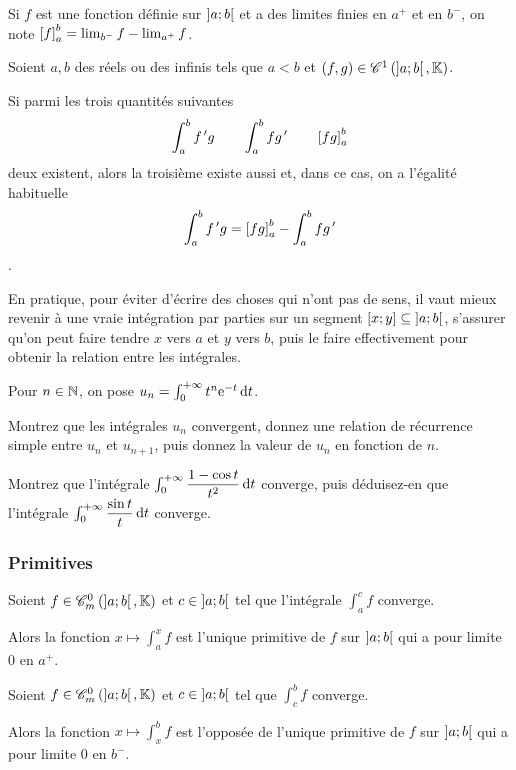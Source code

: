 Si \(f\) est une fonction définie sur \(\left]a;b\right[\) et a des limites finies en \(a^+\) et en \(b^-\), on note \(\left[f\right]_a^b=\lim_{b^-}f-\lim_{a^+}f\).

\begin{prop}
Soient \(a,b\) des réels ou des infinis tels que \(a<b\) et \(\left(f,g\right)\in\mathscr{C}^{1}\left(\left]a;b\right[,\mathbb{K}\right)\).

Si parmi les trois quantités suivantes \[\int_a^bf^{\,\prime} g\qquad\int_a^bfg^{\,\prime}\qquad\left[fg\right]_a^b\] deux existent, alors la troisième existe aussi et, dans ce cas, on a l'égalité habituelle \[\int_a^bf^{\,\prime} g=\left[fg\right]_a^b-\int_a^bfg^{\,\prime}\].
\end{prop}

En pratique, pour éviter d'écrire des choses qui n'ont pas de sens, il vaut mieux revenir à une vraie intégration par parties sur un segment \(\left[x;y\right]\subseteq\left]a;b\right[\), s'assurer qu'on peut faire tendre \(x\) vers \(a\) et \(y\) vers \(b\), puis le faire effectivement pour obtenir la relation entre les intégrales.

\begin{exo}
Pour \(n\in\mathbb{N}\), on pose \(u_n=\int_0^{\pinf}t^n\e{-t}\odif{t}\).

Montrez que les intégrales \(u_n\) convergent, donnez une relation de récurrence simple entre \(u_n\) et \(u_{n+1}\), puis donnez la valeur de \(u_n\) en fonction de \(n\).
\end{exo}

\begin{exo}
Montrez que l'intégrale \(\int_0^{\pinf}\dfrac{1-\cos t}{t^2}\odif{t}\) converge, puis déduisez-en que l'intégrale \(\int_0^{\pinf}\dfrac{\sin t}{t}\odif{t}\) converge.
\end{exo}

\subsubsection{Primitives}

\begin{prop}
Soient \(f\in\contm[\intervee{a}{b}]\) et \(c\in\left]a;b\right[\) tel que l'intégrale \(\int_a^cf\) converge.

Alors la fonction \(x\mapsto\int_a^xf\) est l'unique primitive de \(f\) sur \(\left]a;b\right[\) qui a pour limite \(0\) en \(a^+\).
\end{prop}

\begin{prop}
Soient \(f\in\contm[\intervee{a}{b}]\) et \(c\in\left]a;b\right[\) tel que \(\int_c^bf\) converge.

Alors la fonction \(x\mapsto\int_x^bf\) est l'opposée de l'unique primitive de \(f\) sur \(\left]a;b\right[\) qui a pour limite \(0\) en \(b^-\).
\end{prop}

